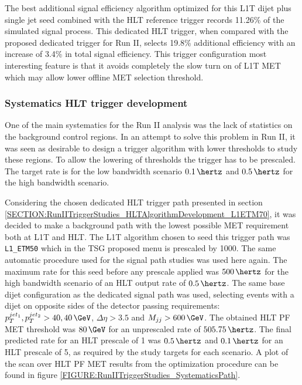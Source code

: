 The best additional signal efficiency algorithm optimized for this \gls{L1T} dijet plus single jet seed combined with the \gls{HLT} reference trigger records 11.26\% of the simulated signal process. This dedicated \gls{HLT} trigger, when compared with the proposed dedicated trigger for Run II, selects 19.8\% additional efficiency with an increase of 3.4\% in total signal efficiency. This trigger configuration most interesting feature is that it avoids completely the slow turn on of \gls{L1T} \gls{MET} which may allow lower offline \gls{MET} selection threshold.

\subsubsection{Systematics HLT trigger development}
\label{SECTION:RunIITriggerStudies_HLTAlgorithmDevelopment_SystematicsPath}


One of the main systematics for the Run II analysis was the lack of statistics on the background control regions. In an attempt to solve this problem in Run II, it was seen as desirable to design a trigger algorithm with lower thresholds to study these regions. To allow the lowering of thresholds the trigger has to be prescaled. The target rate is for the low bandwidth scenario $0.1\,\hertz$ and $0.5\,\hertz$ for the high bandwidth scenario.

Considering the chosen dedicated \gls{HLT} trigger path presented in section \ref{SECTION:RunIITriggerStudies_HLTAlgorithmDevelopment_L1ETM70}, it was decided to make a background path with the lowest possible \gls{MET} requirement both at \gls{L1T} and \gls{HLT}. The \gls{L1T} algorithm chosen to seed this trigger path was \verb|L1_ETM50| which in the \gls{TSG} proposed menu is prescaled by 1000. The same automatic procedure used for the signal path studies was used here again. The maximum rate for this seed before any prescale applied was $500\,\hertz$ for the high bandwidth scenario of an \gls{HLT} output rate of $0.5\,\hertz$. The same base dijet configuration as the dedicated signal path was used, selecting events with a dijet on opposite sides of the detector passing requirements: $p_T^{jet_1},p_T^{jet_2}>40,40\,\GeV$, $\Delta\eta>3.5$ and $M_{jj}>600\,\GeV$. The obtained \gls{HLT} \gls{PF} \gls{MET} threshold was $80\,\GeV$ for an unprescaled rate of $505.75\,\hertz$. The final predicted rate for an \gls{HLT} prescale of 1 was $0.5\,\hertz$ and $0.1\,\hertz$ for an \gls{HLT} prescale of 5, as required by the study targets for each scenario. A plot of the scan over \gls{HLT} \gls{PF} \gls{MET} results from the optimization procedure can be found in figure \ref{FIGURE:RunIITriggerStudies_SystematicsPath}.

